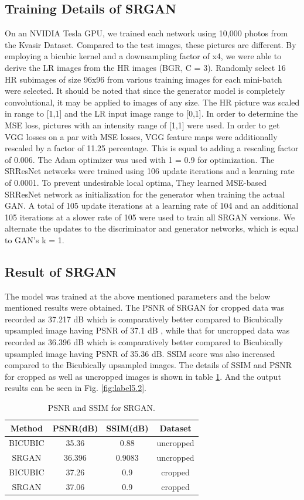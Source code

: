 \subsection{Training Details of SRGAN}
On an NVIDIA Tesla GPU, we trained each network using 10,000 photos from the Kvasir Dataset\cite{data}. Compared to the test images, these pictures are different. By employing a bicubic kernel and a downsampling factor of x4, we were able to derive the LR images from the HR images (BGR, C = 3). Randomly select 16 HR subimages of size 96x96 from various training images for each mini-batch were selected. It should be noted that since the generator model is completely convolutional, it may be applied to images of any size. The HR picture was scaled in range to [1,1] and the LR input image range to [0,1]. In order to determine the MSE loss, pictures with an intensity range of [1,1] were used. In order to get VGG losses on a par with MSE losses, VGG feature maps were additionally rescaled by a factor of 11.25 percentage. This is equal to adding a rescaling factor of 0.006. The Adam optimizer \cite{Adam} was used  with 1 = 0.9 for optimization. The SRResNet networks were trained using 106 update iterations and a learning rate of 0.0001. To prevent undesirable local optima, They learned MSE-based SRResNet network as initialization for the generator when training the actual GAN. A total of 105 update iterations at a learning rate of 104 and an additional 105 iterations at a slower rate of 105 were used to train all SRGAN versions. We alternate the updates to the discriminator and generator networks, which is equal to GAN's\cite{GAN} k = 1. 
\subsection{Result of SRGAN}
The model was trained at the above mentioned parameters and the below mentioned results were obtained. The PSNR of SRGAN for cropped data was recorded as 37.217 dB which is comparatively better compared to Bicubically upsampled image having PSNR of 37.1 dB , while that for uncropped data was recorded as 36.396 dB which is comparatively better compared to Bicubically upsampled image having PSNR of 35.36 dB. SSIM score was also increased compared to the Bicubically upsampled images.
The details of SSIM and PSNR for cropped as well as uncropped images is shown in table \ref{Table:5.1}. And the output results can be seen in Fig. \ref{fig:label5.2}.
\begin{table}[h!]
\centering
\caption{PSNR and SSIM for SRGAN.}
\begin{tabular}{ |c|c|c|c| }
\hline
 Method & PSNR(dB) & SSIM(dB) & Dataset \\ 
  \hline
 BICUBIC &	35.36 &	0.88 & uncropped \\
 SRGAN &	36.396 &	0.9083 & uncropped \\
 BICUBIC &	37.26 &	0.9 & cropped \\
 SRGAN &	37.06	& 0.9 & cropped\\
\hline
\end{tabular}
\label{Table:5.1}
\end{table}
\newline


